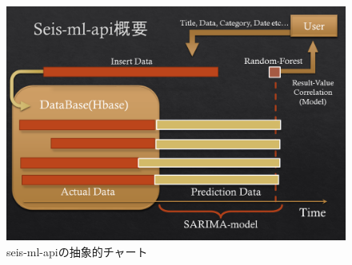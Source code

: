\documentclass{scrartcl}
\begin{document}
\begin{figure}[htbp]
\centering
\includegraphics[width=15cm]{./idea-1.png}
\caption{seis-ml-apiの抽象的チャート}
\end{figure}
\end{document}
